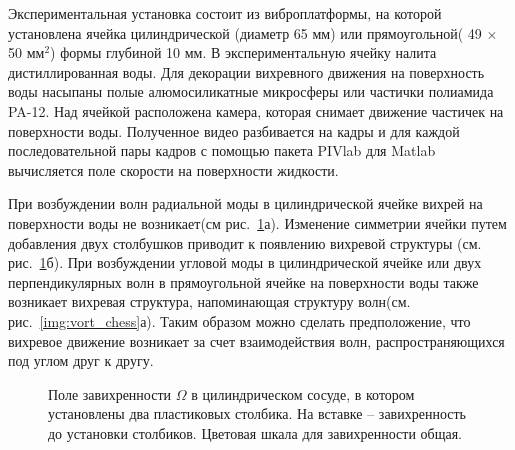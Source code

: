 Экспериментальная установка
 состоит из виброплатформы, на которой установлена ячейка цилиндрической (диаметр 65 мм) или прямоугольной( 49 $\times$ 50 мм$^2$) формы глубиной 10 мм. В экспериментальную ячейку налита дистиллированная воды. Для декорации вихревного движения на поверхность воды насыпаны полые алюмосиликатные микросферы или частички полиамида PA-12. Над ячейкой расположена камера, которая снимает движение частичек на поверхности воды. Полученное видео разбивается на кадры и для каждой последовательной пары кадров с помощью пакета PIVlab для Matlab \cite{PIVlab} вычисляется поле скорости на поверхности жидкости.

При возбуждении волн радиальной моды в цилиндрической ячейке вихрей на поверхности воды не возникает(см рис.~\ref{img:vort_st}а). Изменение симметрии ячейки путем добавления двух столбушков приводит к появлению вихревой структуры (см. рис.~\ref{img:vort_st}б). При возбуждении угловой моды в цилиндрической ячейке или двух перпендикулярных волн в прямоугольной ячейке на поверхности воды также возникает вихревая структура, напоминающая структуру волн(см. рис.~\ref{img:vort_chess}а). Таким образом можно сделать предположение, что вихревое движение возникает за счет взаимодействия волн, распространяющихся под углом друг к другу.

\begin{figure}[ht]
 \begin{minipage}[ht]{0.49\linewidth}
 \end{minipage}
 \hfill
 \begin{minipage}[ht]{0.49\linewidth}
 \end{minipage}
 \caption{Поле завихренности $\Omega$ в цилиндрическом сосуде, в котором установлены два пластиковых столбика. На вставке – завихренность до установки столбиков. Цветовая шкала для завихренности общая.}
 \label{img:vort_st} 
\end{figure}

